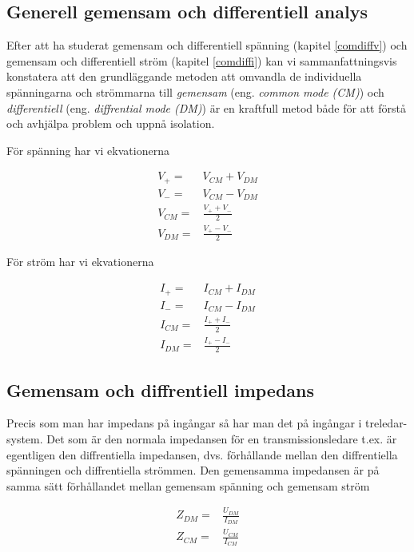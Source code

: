 \subsection{Generell gemensam och differentiell analys}
\label{comdiffgeneric}

Efter att ha studerat gemensam och differentiell spänning (kapitel \ref{comdiffv})
och gemensam och differentiell ström (kapitel \ref{comdiffi}) kan vi
sammanfattningsvis konstatera att den grundläggande metoden att omvandla
de individuella spänningarna och strömmarna till \emph{gemensam}
(eng. \emph{common mode (CM)}) och \emph{differentiell} (eng. \emph{diffrential
mode (DM)}) är en kraftfull metod både för att förstå och avhjälpa problem
och uppnå isolation.

För spänning har vi ekvationerna

\begin{eqnarray}
V_+ = & V_{CM} + V_{DM}\\
V_- = & V_{CM} - V_{DM}\\
V_{CM} = & \frac{V_+ + V_-}{2}\\
V_{DM} = & \frac{V_+ - V_-}{2}
\end{eqnarray}

För ström har vi ekvationerna

\begin{eqnarray}
I_+ = & I_{CM} + I_{DM}\\
I_- = & I_{CM} - I_{DM}\\
I_{CM} = & \frac{I_+ + I_-}{2}\\
I_{DM} = & \frac{I_+ - I_-}{2}
\end{eqnarray}

\subsection{Gemensam och diffrentiell impedans}

Precis som man har impedans på ingångar så har man det på ingångar i treledar-
system. Det som är den normala impedansen för en transmissionsledare t.ex. är
egentligen den diffrentiella impedansen, dvs. förhållande mellan den
diffrentiella spänningen och diffrentiella strömmen. Den gemensamma impedansen
är på samma sätt förhållandet mellan gemensam spänning och gemensam ström

\begin{eqnarray}
Z_{DM} = & \frac{U_{DM}}{I_{DM}}\\
Z_{CM} = & \frac{U_{CM}}{I_{CM}}
\end{eqnarray}

